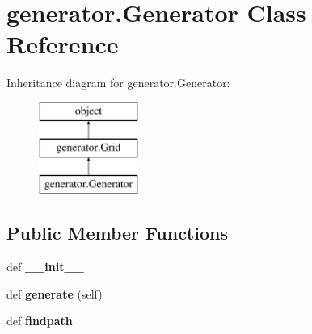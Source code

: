 \hypertarget{classgenerator_1_1_generator}{}\section{generator.\+Generator Class Reference}
\label{classgenerator_1_1_generator}
Inheritance diagram for generator.\+Generator\+:\begin{figure}[H]
\begin{center}
\leavevmode
\includegraphics[height=3.000000cm]{classgenerator_1_1_generator}
\end{center}
\end{figure}
\subsection*{Public Member Functions}
\begin{DoxyCompactItemize}
\item 
\hypertarget{classgenerator_1_1_generator_afe9304030c4852665e2e8c9bd4a61baf}{}def {\bfseries \+\_\+\+\_\+init\+\_\+\+\_\+}\label{classgenerator_1_1_generator_afe9304030c4852665e2e8c9bd4a61baf}

\item 
\hypertarget{classgenerator_1_1_generator_a0fc3be13a43dc777648ea7ca19c655bf}{}def {\bfseries generate} (self)\label{classgenerator_1_1_generator_a0fc3be13a43dc777648ea7ca19c655bf}

\item 
\hypertarget{classgenerator_1_1_generator_a938d7aaf9954fde19e97358c08cbb6f9}{}def {\bfseries findpath}\label{classgenerator_1_1_generator_a938d7aaf9954fde19e97358c08cbb6f9}

\end{DoxyCompactItemize}
